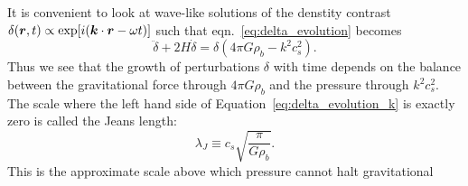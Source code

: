 It is convenient to look at wave-like solutions of the denstity contrast
$\delta(\boldsymbol{r}, t) \propto \exp[i(\boldsymbol{k}\cdot\boldsymbol{r} - \omega t)]$
such that eqn.~\ref{eq:delta_evolution} becomes
\begin{equation}
  \label{eq:delta_evolution_k}
  \ddot{\delta} + 2 H \dot{\delta} = \delta(4\pi G\rho_b - k^2c_s^2).
\end{equation}
Thus we see that the growth of perturbations $\delta$ with time depends
on the balance between the gravitational force through $4\pi G\rho_b$ and the
pressure through $k^2c_s^2$.  The scale where the left hand side of
Equation~\ref{eq:delta_evolution_k} is exactly zero is called the Jeans
length:
\begin{equation}
  \lambda_J \equiv c_s \sqrt{\frac{\pi}{G\rho_b}}.
\end{equation}
This is the approximate scale above which pressure cannot halt gravitational

